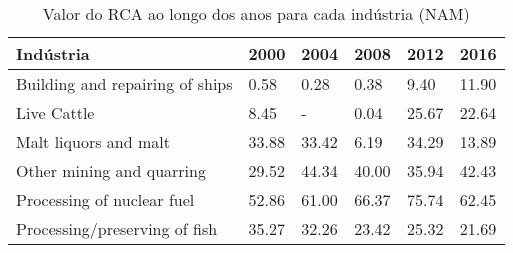 \begin{table}
\centering
\caption{Valor do RCA ao longo dos anos para cada indústria (NAM)}
\begin{tabular}{p{6cm}p{1.5cm}p{1.5cm}p{1.5cm}p{1.5cm}p{1.5cm}}
\toprule
                      Indústria &  2000 &  2004 &  2008 &  2012 &  2016 \\
\midrule
Building and repairing of ships &  0.58 &  0.28 &  0.38 &  9.40 & 11.90 \\
                    Live Cattle &  8.45 &     - &  0.04 & 25.67 & 22.64 \\
          Malt liquors and malt & 33.88 & 33.42 &  6.19 & 34.29 & 13.89 \\
      Other mining and quarring & 29.52 & 44.34 & 40.00 & 35.94 & 42.43 \\
     Processing of nuclear fuel & 52.86 & 61.00 & 66.37 & 75.74 & 62.45 \\
  Processing/preserving of fish & 35.27 & 32.26 & 23.42 & 25.32 & 21.69 \\
\bottomrule
\end{tabular}
\end{table}
